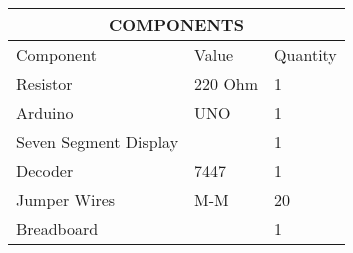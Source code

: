 \label{table:1}
\begin{tabular}{|p{5cm}|p{3cm}|p{2cm}|}
	\hline
	\multicolumn{3}{|c|}{COMPONENTS}\\
	\hline
	Component& Value& Quantity\\
	\hline
	Resistor &220 Ohm& 1\\
	\hline
	Arduino& UNO& 1\\
	\hline
	Seven Segment Display&  & 1\\              
	\hline                                     
	Decoder& 7447& 1\\                         
	\hline                                    
	Jumper Wires& M-M& 20\\                  
	\hline                                    
	Breadboard&  & 1\\                         
	\hline                                     
\end{tabular}
